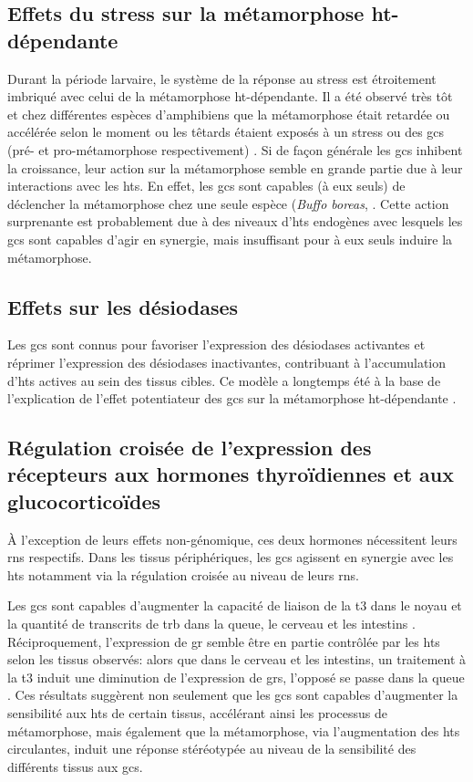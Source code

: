 \documentclass[../main.tex]{subfiles}
\begin{document}


\subsection{Effets du stress sur la métamorphose \gls{ht}-dépendante}
Durant la période larvaire, le système de la réponse au stress est étroitement imbriqué avec celui de la métamorphose \gls{ht}-dépendante.
Il a été observé très tôt et chez différentes espèces d'amphibiens que la métamorphose était retardée ou accélérée selon le moment ou les têtards étaient exposés à un stress ou des \glspl{gc} (pré- et pro-métamorphose respectivement) \citep{Kobayashi1958,Kikuyama1983}.
Si de façon générale les \glspl{gc} inhibent la croissance, leur action sur la métamorphose semble en grande partie due à leur interactions avec les \glspl{ht}.
En effet, les \glspl{gc} sont capables (à eux seuls) de déclencher la métamorphose chez une seule espèce (\textit{Buffo boreas}, \citealp{Hayes1993a}.
Cette action surprenante est probablement due à des niveaux d'\glspl{ht} endogènes avec lesquels les \glspl{gc} sont capables d'agir en synergie, mais insuffisant pour à eux seuls induire la métamorphose.

\subsection{Effets sur les désiodases}
Les \glspl{gc} sont connus pour favoriser l'expression des désiodases activantes et réprimer l'expression des désiodases inactivantes, contribuant à l'accumulation d'\glspl{ht} actives au sein des tissus cibles.
Ce modèle a longtemps été à la base de l'explication de l'effet potentiateur des \glspl{gc} sur la métamorphose \gls{ht}-dépendante \citep{Galton1990}.

\subsection{Régulation croisée de l'expression des récepteurs aux hormones thyroïdiennes et aux glucocorticoïdes}
À l'exception de leurs effets non-génomique, ces deux hormones nécessitent leurs \glspl{rn} respectifs.
Dans les tissus périphériques, les \glspl{gc} agissent en synergie avec les \glspl{ht} notamment via la régulation croisée au niveau de leurs \glspl{rn}.

Les \glspl{gc} sont capables d'augmenter la capacité de liaison de la \gls{t3} dans le noyau \citep{Kikuyama1983} et la quantité de transcrits de \gls{trb} dans la queue, le cerveau et les intestins \citep{Bonett2010}.
Réciproquement, l'expression de \gls{gr} semble être en partie contrôlée par les \glspl{ht} selon les tissus observés: alors que dans le cerveau et les intestins, un traitement à la \gls{t3} induit une diminution de l'expression de \glspl{gr}, l'opposé se passe dans la queue \citep{Krain2004}.
Ces résultats suggèrent non seulement que les \glspl{gc} sont capables d'augmenter la sensibilité aux \glspl{ht} de certain tissus, accélérant ainsi les processus de métamorphose, mais également que la métamorphose, via l'augmentation des \glspl{ht} circulantes, induit une réponse stéréotypée au niveau de la sensibilité des différents tissus aux \glspl{gc}.
\end{document}
